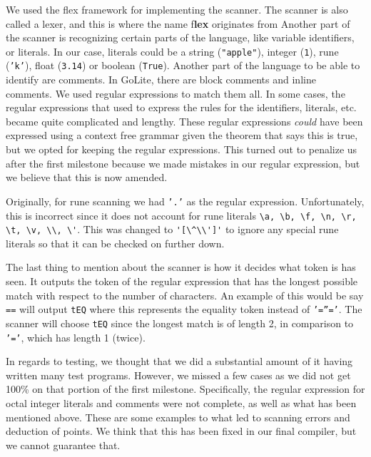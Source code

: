 \documentclass{article}
\begin{document}
We used the flex framework for implementing the scanner. The scanner is also called a lexer, and this is where the name f\textbf{lex} originates from
Another part of the scanner is recognizing certain parts of the language, like variable identifiers, or literals. In our case, literals could be a string (\texttt{"apple"}), integer (\texttt{1}), rune (\texttt{'k'}), float (\texttt{3.14}) or boolean (\texttt{True}). Another part of the language to be able to identify are comments. In GoLite, there are block comments and inline comments. We used regular expressions to match them all. In some cases, the regular expressions that used to express the rules for the identifiers, literals, etc. became quite complicated and lengthy. These regular expressions \textit{could} have been expressed using a context free grammar given the theorem that says this is true, but we opted for keeping the regular expressions. This turned out to penalize us after the first milestone because we made mistakes in our regular expression, but we believe that this is now amended.

Originally, for rune scanning we had \texttt{'.'} as the regular expression. Unfortunately, this is incorrect since it does not account for rune literals \verb|\a, \b, \f, \n, \r, \t, \v, \\, \'|. This was changed to \verb|'[\^\\']'| to ignore any special rune literals so that it can be checked on further down.

The last thing to mention about the scanner is how it decides what token is has seen. It outputs the token of the regular expression that has the longest possible match with respect to the number of characters. An example of this would be say \texttt{==} will output \texttt{tEQ} where this represents the equality token instead of \texttt{'=''='}. The scanner will choose \texttt{tEQ} since the longest match is of length 2, in comparison to \texttt{'='}, which has length 1 (twice).

In regards to testing, we thought that we did a substantial amount of it having written many test programs. However, we missed a few cases as we did not get 100\% on that portion of the first milestone. Specifically, the regular expression for octal integer literals and comments were not complete, as well as what has been mentioned above. These are some examples to what led to scanning errors and deduction of points. We think that this has been fixed in our final compiler, but we cannot guarantee that.
\end{document}
